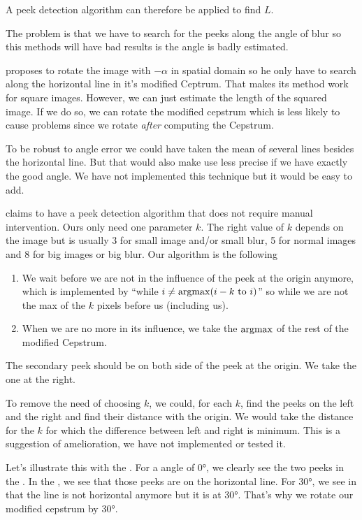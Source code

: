 A peek detection algorithm can therefore be applied
to find $L$.

The problem is that we have to search for the peeks along
the angle of blur so this methods will have
bad results is the angle is badly estimated.

\cite{Deshpande2014606} proposes to rotate the image
with $-\alpha$ in spatial domain so he only have to
search along the horizontal line in it's modified Ceptrum.
That makes its method work for square images.
However, we can just estimate the length of the squared image.
If we do so, we can rotate the modified cepstrum which is less
likely to cause problems since we rotate \emph{after}
computing the Cepstrum.

To be robust to angle error we could have taken the mean of
several lines besides the horizontal line.
But that would also make use less precise if we have exactly
the good angle.
We have not implemented this technique but it would
be easy to add.

\cite{Deshpande2014606} claims to have a peek detection
algorithm that does not require manual intervention.
Ours only need one parameter $k$.
The right value of $k$ depends on the image but is
usually 3 for small image and/or small blur,
5 for normal images and 8 for big images or big blur.
Our algorithm is the following
\begin{enumerate}
  \item We wait before we are not in the influence of the peek
    at the origin anymore, which is implemented by
    ``while $i \neq \operatorname{argmax}(i-k\text{ to }i)$'' so
    while we are not the max of the $k$ pixels before us
    (including us).
  \item When we are no more in its influence, we take the
    $\operatorname{argmax}$ of the rest of the modified Cepstrum.
\end{enumerate}

The secondary peek should be on both side of the peek at the
origin.
We take the one at the right.

To remove the need of choosing $k$, we could,
for each $k$, find the peeks on the left and the right and
find their distance with the origin.
We would take the distance for the $k$ for which
the difference between left and right is minimum.
This is a suggestion of amelioration,
we have not implemented or tested it.

Let's illustrate this with the .
For a angle of \ang{0}, we clearly see the two peeks
in the .
In the ,
we see that those peeks are on the horizontal line.
For \ang{30}, we see in 
that the line is not horizontal anymore but it is at \ang{30}.
That's why we rotate our modified cepstrum by \ang{30}.

